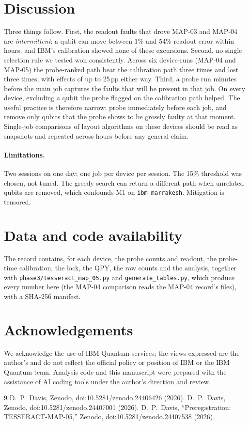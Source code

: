 \documentclass[10pt,twocolumn]{article}
\begin{document}
\section{Discussion}
Three things follow. First, the readout faults that drove MAP-03 and MAP-04 are \emph{intermittent}:
a qubit can move between 1\% and 54\% readout error within hours, and IBM's calibration showed none of
these excursions. Second, no single selection rule we tested won consistently. Across six device-runs
(MAP-04 and MAP-05) the probe-ranked path beat the calibration path three times and lost three times,
with effects of up to 25\,pp either way. Third, a probe run minutes before the main job captures the
faults that will be present in that job. On every device, excluding a qubit the probe flagged on the
calibration path helped. The useful practice is therefore narrow: probe immediately before each job,
and remove only qubits that the probe shows to be grossly faulty at that moment. Single-job
comparisons of layout algorithms on these devices should be read as snapshots and repeated across
hours before any general claim.

\paragraph{Limitations.} Two sessions on one day; one job per device per session. The 15\% threshold
was chosen, not tuned. The greedy search can return a different path when unrelated qubits are
removed, which confounds M1 on \texttt{ibm\_marrakesh}. Mitigation is tensored.

\section*{Data and code availability}
The record contains, for each device, the probe counts and readout, the probe-time calibration, the lock,
the QPY, the raw counts and the analysis, together with \texttt{phase3/tesseract\_map\_05.py} and
\texttt{generate\_tables.py}, which produce every number here (the MAP-04 comparison reads the MAP-04
record's files), with a SHA-256 manifest.

\section*{Acknowledgements}
We acknowledge the use of IBM Quantum services; the views expressed are the author's and do not
reflect the official policy or position of IBM or the IBM Quantum team. Analysis code and this
manuscript were prepared with the assistance of AI coding tools under the author's direction and
review.

\begin{thebibliography}{9}\small
{} D.~P.~Davis, Zenodo, doi:10.5281/zenodo.24406426 (2026).
 D.~P.~Davis, Zenodo, doi:10.5281/zenodo.24407001 (2026).
 D.~P.~Davis, ``Preregistration: TESSERACT-MAP-05,'' Zenodo, doi:10.5281/zenodo.24407538 (2026).
\end{thebibliography}
\end{document}
